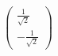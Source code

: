 \documentclass[preview]{standalone}
\begin{document}
\begin{align*}
\begin{pmatrix} \frac{1}{\sqrt{2}} \\[6px] -\frac{1}{\sqrt{2}} \end{pmatrix}
\end{align*}
\end{document}
